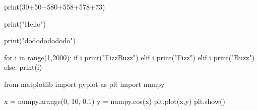 \documentclass[uplatex,dvipdfmx]{jsarticle}
\begin{document}
\begin{outframebox}
  \begin{jupytex}
print(30+50+580+558+578+73)
  \end{jupytex}
  \begin{jupytex}
print("Hello")
  \end{jupytex}
  \begin{jupytex}
print("dodododododo")
  \end{jupytex}
  \begin{jupytex}
for i in range(1,2000):
   if i%
       print("FizzBuzz")
   elif i%
       print("Fizz")
   elif i%
       print("Buzz")
   else:
       print(i)
  \end{jupytex}
  \begin{jupytex}
from matplotlib import pyplot as plt
import numpy

x = numpy.arange(0, 10, 0.1)
y = numpy.cos(x)
plt.plot(x,y)
plt.show()
\end{jupytex}
\end{outframebox}
\end{document}
